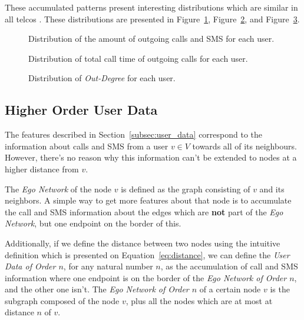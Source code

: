 These accumulated patterns present interesting distributions which are similar in all telcos . These distributions are presented in Figure~\ref{fig:callsms}, Figure~\ref{fig:time}, and Figure~\ref{fig:contacts}.

\begin{figure}
\caption{Distribution of the amount of outgoing calls and SMS for each user.}
\label{fig:callsms}
\end{figure}

\begin{figure}
\caption{Distribution of total call time of outgoing calls for each user.}
\label{fig:time}
\end{figure}

\begin{figure}
\caption{Distribution of \emph{Out-Degree} for each user.}
\label{fig:contacts}
\end{figure}

\subsection{Higher Order User Data}

The features described in Section~\ref{subsec:user_data} correspond to the information about calls and SMS from a user $v \in V$ towards all of its neighbours. However, there's no reason why this information can't be extended to nodes at a higher distance from $v$.

The \emph{Ego Network} of the node $v$ is defined as the graph consisting of $v$ and its neighbors. A simple way to get more features about that node is to accumulate the call and SMS information about the edges which are \textbf{not} part of the \emph{Ego Network}, but one endpoint on the border of this.

Additionally, if we define the distance between two nodes using the intuitive definition which is presented on Equation~\ref{eq:distance}, we can define the \emph{User Data of Order $n$}, for any natural number $n$, as the accumulation of call and SMS information where one endpoint is on the border of the \emph{Ego Network of Order $n$}, and the other one isn't. The \emph{Ego Network of Order $n$} of a certain node $v$ is the subgraph composed of the node $v$, plus all the nodes which are at most at distance $n$ of $v$.

